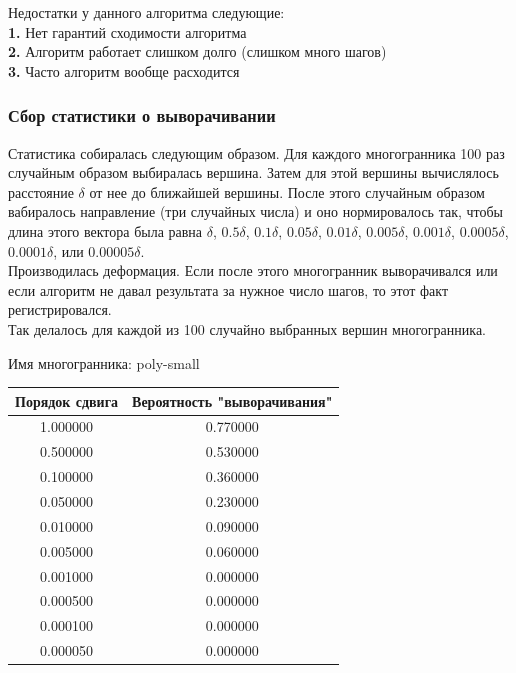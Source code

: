 \documentclass[a4paper,12pt, titlepage]{article}
\begin{document}
\begin{flushleft}
Недостатки у данного алгоритма следующие:\\
 	\textbf{1. }Нет гарантий сходимости алгоритма\\
	\textbf{2. }Алгоритм работает слишком долго (слишком много шагов)\\
	\textbf{3. }Часто алгоритм вообще расходится\\
\end{flushleft}

\subsubsection{Сбор статистики о выворачивании}
\begin{flushleft}
 Статистика собиралась следующим образом. Для каждого многогранника 100 раз случайным образом
выбиралась вершина. Затем для этой вершины вычислялось расстояние $\delta$ от нее до ближайшей вершины.
После этого случайным образом вабиралось направление (три случайных числа) и оно нормировалось так, чтобы
длина этого вектора была равна $\delta$, $0.5\delta$, $0.1\delta$, $0.05\delta$, $0.01\delta$, $0.005\delta$, $0.001\delta$,
$0.0005\delta$, $0.0001\delta$, или $0.00005\delta$. \\
Производилась деформация. Если после этого многогранник выворачивался или если алгоритм не давал
результата за нужное число шагов, то этот факт регистрировался.\\
Так делалось для каждой из 100 случайно выбранных вершин многогранника.
\end{flushleft}


\begin{flushleft}
Имя многогранника: poly-small\\
\begin{tabular}{|c|c|}
\hline
	Порядок сдвига & Вероятность "выворачивания"\\
\hline
	1.000000 &	0.770000\\
\hline
	0.500000 &	0.530000\\
\hline
	0.100000 &	0.360000\\
\hline
	0.050000 &	0.230000\\
\hline
	0.010000 &	0.090000\\
\hline
	0.005000 &	0.060000\\
\hline
	0.001000 &	0.000000\\
\hline
	0.000500 &	0.000000\\
\hline
	0.000100 &	0.000000\\
\hline
	0.000050 &	0.000000\\
\hline
\end{tabular} 
\end{flushleft}
\end{document}
